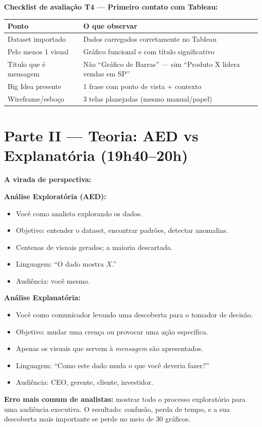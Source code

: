 \begin{BoardBox}
\textbf{Checklist de avaliação T4 — Primeiro contato com Tableau:}
\begin{tabular}{|p{4.5cm}|p{8.5cm}|}
\hline
\textbf{Ponto} & \textbf{O que observar} \\
\hline
Dataset importado & Dados carregados corretamente no Tableau \\
Pelo menos 1 visual & Gráfico funcional e com título significativo \\
Título que é mensagem & Não ``Gráfico de Barras'' — sim ``Produto X lidera vendas em SP'' \\
Big Idea presente & 1 frase com ponto de vista + contexto \\
Wireframe/esboço & 3 telas planejadas (mesmo manual/papel) \\
\hline
\end{tabular}
\end{BoardBox}

\section{Parte II — Teoria: AED vs Explanatória (19h40–20h)}

\begin{SolvedBox}
\textbf{A virada de perspectiva:}

\textbf{Análise Exploratória (AED):}
\begin{itemize}
  \item Você como analista explorando os dados.
  \item Objetivo: entender o dataset, encontrar padrões, detectar anomalias.
  \item Centenas de visuais gerados; a maioria descartada.
  \item Linguagem: ``O dado mostra $X$.''
  \item Audiência: você mesmo.
\end{itemize}

\textbf{Análise Explanatória:}
\begin{itemize}
  \item Você como comunicador levando uma descoberta para o tomador de decisão.
  \item Objetivo: mudar uma crença ou provocar uma ação específica.
  \item Apenas os visuais que servem à \emph{mensagem} são apresentados.
  \item Linguagem: ``Como este dado muda o que você deveria fazer?''
  \item Audiência: CEO, gerente, cliente, investidor.
\end{itemize}

\textbf{Erro mais comum de analistas:} mostrar todo o processo exploratório
para uma audiência executiva. O resultado: confusão, perda de tempo, e a
sua descoberta mais importante se perde no meio de 30 gráficos.
\end{SolvedBox}

